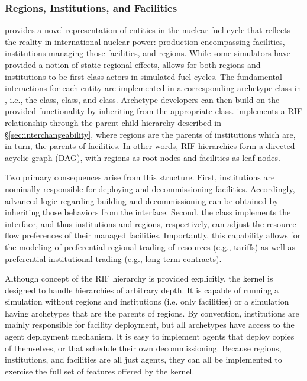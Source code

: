 \subsubsection{Regions, Institutions, and Facilities}

\Cyclus provides a novel representation of entities in the nuclear fuel cycle
that reflects the reality in international nuclear power: production
encompassing facilities, institutions managing those facilities, and regions. While
some simulators \cite{andrianova_desae_2008} have provided a notion of static regional
effects, \Cyclus allows for both regions and institutions to be first-class
actors in simulated fuel cycles. The fundamental interactions for each entity are implemented in a corresponding
archetype class in \Cyclus, i.e., the  class, 
class, and  class. Archetype developers can then build on the
provided functionality by inheriting from the appropriate class.
\Cyclus implements a \gls{RIF} relationship through the
parent-child hierarchy described in \S \ref{sec:interchangeability}, where
regions are the parents of institutions which are, in turn, the parents of
facilities. In other words, \gls{RIF} hierarchies form a directed acyclic graph (DAG),
with regions as root nodes and facilities as leaf nodes.

Two primary consequences arise from this structure. First, institutions are
nominally
responsible for deploying and decommissioning facilities. Accordingly, advanced
logic regarding building and decommissioning can be obtained by inheriting
those behaviors from the
 interface. Second, the  class implements the
 interface, and thus institutions and regions, respectively, can
adjust the resource flow preferences of their managed facilities. Importantly,
this capability allows for the modeling of preferential regional trading
of resources (e.g., tariffs) as well as preferential institutional trading
(e.g., long-term contracts).

Although concept of the \gls{RIF} hierarchy is provided explicitly, the \Cyclus kernel is
designed to handle hierarchies of arbitrary depth.  It is capable of
running a simulation without regions and institutions (i.e.  only facilities)
or a simulation having archetypes that are the parents of regions.  By
convention, institutions are mainly responsible for facility deployment, but
all archetypes have access to the agent deployment mechanism.  It is easy
to implement agents that deploy copies of themselves, or that schedule their
own decommissioning.  Because regions, institutions, and facilities are all
just agents, they can all be implemented to exercise the full set of features
offered by the \Cyclus kernel.

